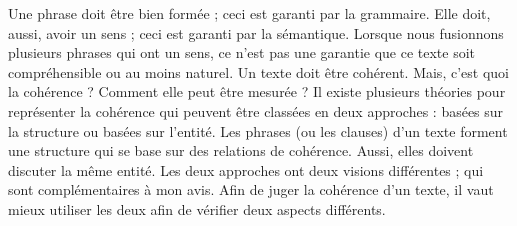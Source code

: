 \documentclass{KodeBook}
\begin{document}
\begin{discussion}
Une phrase doit être bien formée ; ceci est garanti par la grammaire. 
Elle doit, aussi, avoir un sens ; ceci est garanti par la sémantique. 
Lorsque nous fusionnons plusieurs phrases qui ont un sens, ce n'est pas une garantie que ce texte soit compréhensible ou au moins naturel. 
Un texte doit être cohérent. 
Mais, c'est quoi la cohérence ? Comment elle peut être mesurée ?
Il existe plusieurs théories pour représenter la cohérence qui peuvent être classées en deux approches : basées sur la structure ou basées sur l'entité. 
Les phrases (ou les clauses) d'un texte forment une structure qui se base sur des relations de cohérence. 
Aussi, elles doivent discuter la même entité.
Les deux approches ont deux visions différentes ; qui sont complémentaires à mon avis. 
Afin de juger la cohérence d'un texte, il vaut mieux utiliser les deux afin de vérifier deux aspects différents.

\end{discussion}

\ifx\wholebook\relax\else
% 
% 
	
\end{document}

